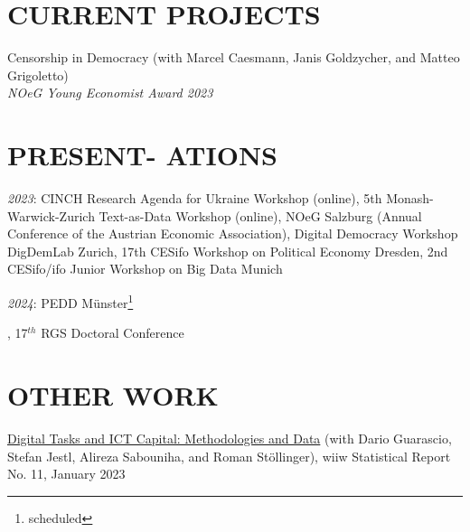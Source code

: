 \documentclass[margin, 12pt]{res} %
\begin{document}
\begin{resume}
		\section{CURRENT PROJECTS}
		
		Censorship in Democracy (with Marcel Caesmann, Janis Goldzycher, and Matteo Grigoletto) \\
		{\sl NOeG Young Economist Award 2023}
		
		
		
		
		\section{PRESENT- ATIONS}
		{\sl2023}: CINCH Research Agenda for Ukraine Workshop (online), 5th Monash-Warwick-Zurich Text-as-Data Workshop (online), NOeG Salzburg (Annual Conference of the Austrian Economic Association), Digital Democracy Workshop DigDemLab Zurich, 17th CESifo Workshop on Political Economy Dresden, 2nd CESifo/ifo Junior Workshop on Big Data Munich
		
		{\sl2024}: PEDD Münster\footnote{ scheduled}\addtocounter{footnote}{-1}, 17$^{th}$ RGS Doctoral Conference\footnotemark\addtocounter{footnote}{-1}
		
		\section{OTHER WORK}
		
		
		\href{https://wiiw.ac.at/digital-tasks-and-ict-capital-methodologies-and-data-p-6429.html}{Digital Tasks and ICT Capital: Methodologies and Data} (with Dario Guarascio, Stefan Jestl, Alireza Sabouniha, and Roman Stöllinger), wiiw Statistical Report No. 11, January 2023
		

\end{resume}
\end{document}
